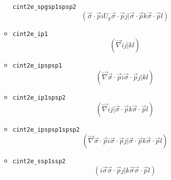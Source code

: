 \documentclass{article}
\begin{document}
\begin{itemize}
\begin{itemize}
    \verb!cint2e_spgsp1spsp2!
    \[(\vec{\sigma}\cdot\vec{p} i U_g \vec{\sigma}\cdot\vec{p} j| \vec{\sigma}\cdot\vec{p} k \vec{\sigma}\cdot\vec{p}l)\]
  \item
    \verb!cint2e_ip1! \[(\vec{\nabla} i j| kl)\]
  \item
    \verb!cint2e_ipspsp1!
    \[(\vec{\nabla} \vec{\sigma}\cdot\vec{p} i \vec{\sigma}\cdot\vec{p} j| kl)\]
  \item
    \verb!cint2e_ip1spsp2!
    \[(\vec{\nabla} i j| \vec{\sigma}\cdot\vec{p} k \vec{\sigma}\cdot\vec{p}l)\]
  \item
    \verb!cint2e_ipspsp1spsp2!
    \[(\vec{\nabla} \vec{\sigma}\cdot\vec{p} i \vec{\sigma}\cdot\vec{p} j| \vec{\sigma}\cdot\vec{p} k \vec{\sigma}\cdot\vec{p}l)\]
  \item
    \verb!cint2e_ssp1ssp2!
    \[( i \vec{\sigma}\vec{\sigma}\cdot\vec{p} j|k \vec{\sigma}\vec{\sigma}\cdot\vec{p}l)\]
  \end{itemize}
\end{itemize}
\end{document}
